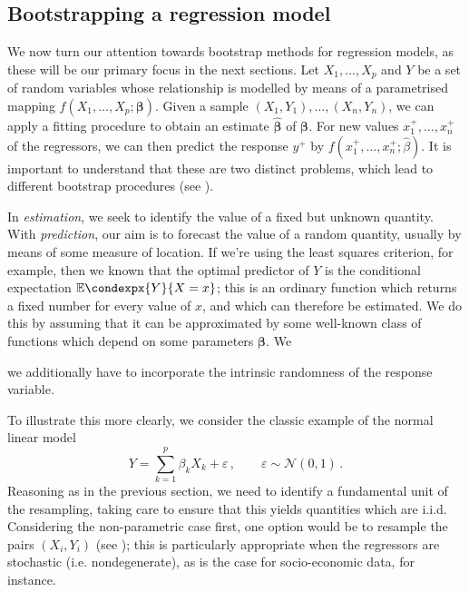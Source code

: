 \documentclass[a4paper]{book}
\theoremstyle{plain}
\newcommand{\condexp}{\mathbb{E}\condexpx}
\begin{document}
\subsection{Bootstrapping a regression model} \label{subsec:boot-reg}

We now turn our attention towards bootstrap methods for regression models, as these will be our primary focus in the next sections. Let $X_1, \dots, X_p$ and $Y$ be a set of random variables whose relationship is modelled by means of a parametrised mapping $f(X_1, \dots, X_p; \bm{\beta})$. Given a sample $(X_1, Y_1), \dots, (X_n, Y_n)$, we can apply a fitting procedure to obtain an estimate $\hat{\bm{\beta}}$ of $\bm{\beta}$. For new values $x_1^+, \dots, x_n^+$ of the regressors, we can then predict the response $y^+$ by $f(x_1^+, \dots, x_n^+; \hat{\beta})$. It is important to understand that these are two distinct problems, which lead to different bootstrap procedures (see \cite[Secttions 6.3.3 and 7.2.4]{davison}). 

In \emph{estimation}, we seek to identify the value of a fixed but unknown quantity. With \emph{prediction}, our aim is to forecast the value of a random quantity, usually by means of some measure of location. If we're using the least squares criterion, for example, then we known that the optimal predictor of $Y$ is the conditional expectation $\condexp{Y}{X = x}$; this is an ordinary function which returns a fixed number for every value of $x$, and which can therefore be estimated. We do this by assuming that it can be approximated by some well-known class of functions which depend on some parameters $\bm{\beta}$. We

we additionally have to incorporate the intrinsic randomness of the response variable.

To illustrate this more clearly, we consider the classic example of the normal linear model
\begin{equation}
    Y = \sum_{k=1}^p \beta_k X_k + \varepsilon\,, \qquad \varepsilon \sim \mathcal{N}(0, 1) \,.
\end{equation}
Reasoning as in the previous section, we need to identify a fundamental unit of the resampling, taking care to ensure that this yields quantities which are i.i.d. Considering the non-parametric case first, one option would be to resample the pairs $(X_i, Y_i)$ (see \cite[Algorithm 6.2]{davison}); this is particularly appropriate when the regressors are stochastic (i.e. nondegenerate), as is the case for socio-economic data, for instance. 
\end{document}
